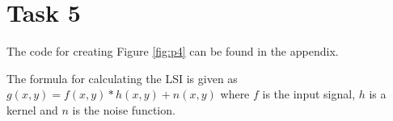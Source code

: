 \section{Task 5}
The code for creating Figure \ref{fig:p4} can be found in the appendix.


The formula for calculating the LSI is given as $g(x,y) = f(x,y) * h(x,y) + n(x,y)$ where $f$ is the
input signal, $h$ is a kernel and $n$ is the noise function.